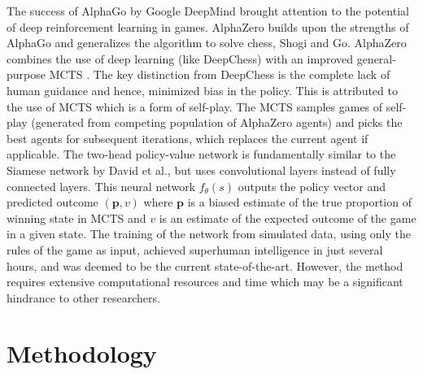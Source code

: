 \documentclass[letterpaper]{article} %
\begin{document}
The success of AlphaGo by Google DeepMind brought attention to the potential of deep reinforcement learning \cite{alphago2016} in games. AlphaZero builds upon the strengths of AlphaGo and generalizes the algorithm to solve chess, Shogi and Go. AlphaZero combines the use of deep learning (like DeepChess) with an improved general-purpose MCTS \cite{alphazero2018}. The key distinction from DeepChess is the complete lack of human guidance and hence, minimized bias in the policy. This is attributed to the use of MCTS which is a form of self-play. The MCTS samples games of self-play (generated from competing population of AlphaZero agents) and picks the best agents for subsequent iterations, which replaces the current agent if applicable. The two-head policy-value network is fundamentally similar to the Siamese network by David et al., but uses convolutional layers instead of fully connected layers. This neural network $f_\theta(s)$ outputs the policy vector and predicted outcome $(\textbf{p}, v)$ where $\textbf{p}$ is a biased estimate of the true proportion of winning state in MCTS and $v$ is an estimate of the expected outcome of the game in a given state. The training of the network from simulated data, using only the rules of the game as input, achieved superhuman intelligence in just several hours, and was deemed to be the current state-of-the-art. However, the method requires extensive computational resources and time which may be a significant hindrance to other researchers.


\section{Methodology}



\end{document}

